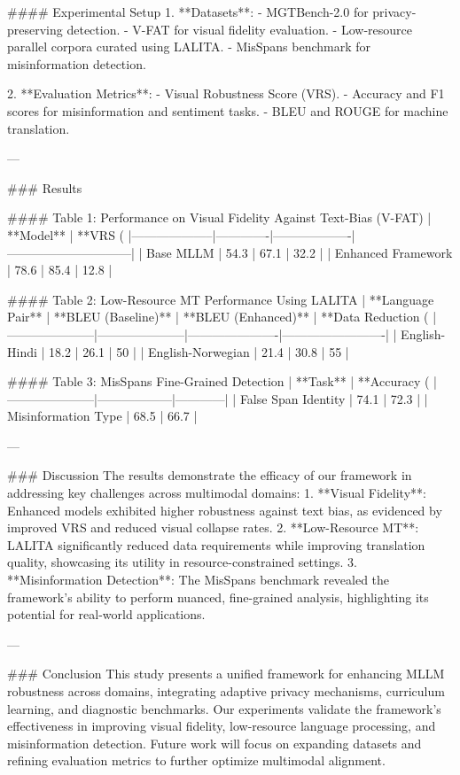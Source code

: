 #### Experimental Setup
1. **Datasets**:
   - MGTBench-2.0 for privacy-preserving detection.
   - V-FAT for visual fidelity evaluation.
   - Low-resource parallel corpora curated using LALITA.
   - MisSpans benchmark for misinformation detection.

2. **Evaluation Metrics**:
   - Visual Robustness Score (VRS).
   - Accuracy and F1 scores for misinformation and sentiment tasks.
   - BLEU and ROUGE for machine translation.

---

### Results

#### Table 1: Performance on Visual Fidelity Against Text-Bias (V-FAT)
| **Model**         | **VRS (%
|--------------------|-------------|-------------------|------------------------------|
| Base MLLM         | 54.3        | 67.1              | 32.2                         |
| Enhanced Framework | 78.6        | 85.4              | 12.8                         |

#### Table 2: Low-Resource MT Performance Using LALITA
| **Language Pair**  | **BLEU (Baseline)** | **BLEU (Enhanced)** | **Data Reduction (%
|---------------------|---------------------|----------------------|-------------------------|
| English-Hindi      | 18.2               | 26.1                | 50                     |
| English-Norwegian  | 21.4               | 30.8                | 55                     |

#### Table 3: MisSpans Fine-Grained Detection
| **Task**           | **Accuracy (%
|---------------------|------------------|------------|
| False Span Identity | 74.1            | 72.3       |
| Misinformation Type | 68.5            | 66.7       |

---

### Discussion
The results demonstrate the efficacy of our framework in addressing key challenges across multimodal domains:
1. **Visual Fidelity**: Enhanced models exhibited higher robustness against text bias, as evidenced by improved VRS and reduced visual collapse rates.
2. **Low-Resource MT**: LALITA significantly reduced data requirements while improving translation quality, showcasing its utility in resource-constrained settings.
3. **Misinformation Detection**: The MisSpans benchmark revealed the framework's ability to perform nuanced, fine-grained analysis, highlighting its potential for real-world applications.

---

### Conclusion
This study presents a unified framework for enhancing MLLM robustness across domains, integrating adaptive privacy mechanisms, curriculum learning, and diagnostic benchmarks. Our experiments validate the framework's effectiveness in improving visual fidelity, low-resource language processing, and misinformation detection. Future work will focus on expanding datasets and refining evaluation metrics to further optimize multimodal alignment.

